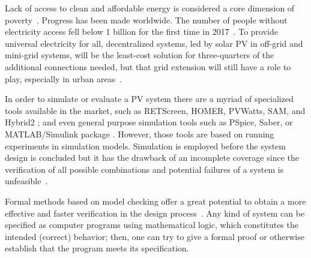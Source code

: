\documentclass[runningheads]{llncs}
\begin{document}
%
%
Lack of access to clean and affordable energy is considered a core dimension of poverty~\cite{Hussein2012}. Progress has been made worldwide. The number of people without electricity access fell below 1 billion for the first time in 2017~\cite{IEAweo2018}. To provide universal electricity for all, decentralized systems, led by solar PV in off-grid and mini-grid systems, will be the least-cost solution for three-quarters of the additional connections needed, but that grid extension will still have a role to play, especially in urban areas~\cite{IEAweo2018}.

%
In order to simulate or evaluate a PV system there are a myriad of specialized tools available in the market, such as RETScreen, HOMER, PVWatts, SAM, and Hybrid2 \cite{Pradhan,Swarnkar,NRELDobos,NRELBlair,Mills}; and even general purpose simulation tools such as PSpice, Saber, or MATLAB/Simulink package \cite{Gow1999,Benatiallah2017}. However, those tools are based on running experiments in simulation models. Simulation %
is employed before the system design is concluded but it has the drawback of an incomplete coverage since the verification of all possible combinations and potential failures of a system is unfeasible~\cite{ClarkeHV18}.

Formal methods based on model checking offer a great potential to obtain a more effective and faster verification in the design process~\cite{ClarkeHV18}. Any kind of system can be specified as computer programs using mathematical logic, which constitutes the intended (correct) behavior; then, one can try to give a formal proof or otherwise establish that the program meets its specification. 
\end{document}
